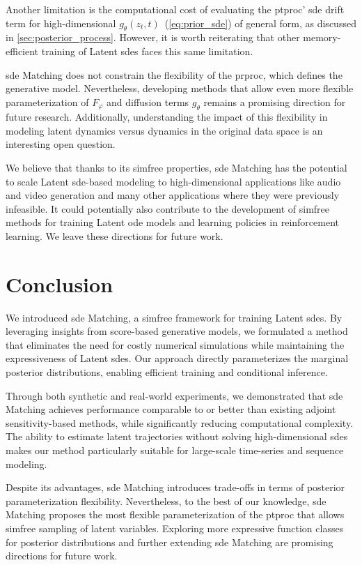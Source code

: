 \documentclass{article}
\def\ph{\varphi}
\def\th{\theta}
\theoremstyle{plain}
\theoremstyle{definition}
\theoremstyle{remark}
\begin{document}
Another limitation is the computational cost of evaluating the \gls{ptproc}' \gls{sde} drift term for high-dimensional $g_\th(z_t, t)$~(\cref{eq:prior_sde}) of general form, as discussed in \cref{sec:posterior_process}. However, it is worth reiterating that other memory-efficient training of Latent \glspl{sde} faces this same limitation.


\gls{sde} Matching does not constrain the flexibility of the \gls{prproc}, which defines the generative model. Nevertheless, developing methods that allow even more flexible parameterization of $F_\ph$ and diffusion terms $g_\th$ remains a promising direction for future research. Additionally, understanding the impact of this flexibility in modeling latent dynamics versus dynamics in the original data space is an interesting open question.


We believe that thanks to its \gls{simfree} properties, \gls{sde} Matching has the potential to scale Latent \gls{sde}-based modeling to high-dimensional applications like audio and video generation and many other applications where they were previously infeasible. It could potentially also contribute to the development of \gls{simfree} methods for training Latent \gls{ode} models and  learning policies in reinforcement learning. We leave these directions for future work.


\section{Conclusion}
\label{sec:conclusion}


We introduced \gls{sde} Matching, a \gls{simfree} framework for training Latent \glspl{sde}. By leveraging insights from score-based generative models, we formulated a method that eliminates the need for costly numerical simulations while maintaining the expressiveness of Latent \glspl{sde}. Our approach directly parameterizes the marginal posterior distributions, enabling efficient training and conditional inference.


Through both synthetic and real-world experiments, we demonstrated that \gls{sde} Matching achieves performance comparable to or better than existing adjoint sensitivity-based methods, while significantly reducing computational complexity. The ability to estimate latent trajectories without solving high-dimensional \glspl{sde} makes our method particularly suitable for large-scale time-series and sequence modeling.


Despite its advantages, \gls{sde} Matching introduces trade-offs in terms of posterior parameterization flexibility. Nevertheless, to the best of our knowledge, \gls{sde} Matching proposes the most flexible parameterization of the \gls{ptproc} that allows \gls{simfree} sampling of latent variables. Exploring more expressive function classes for posterior distributions and further extending \gls{sde} Matching are promising directions for future work.
\end{document}
